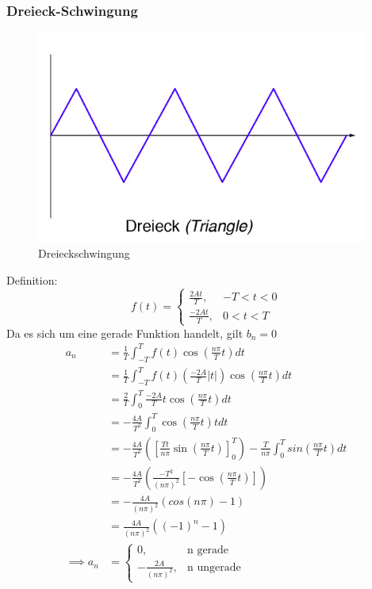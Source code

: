   \subsubsection{Dreieck-Schwingung}
  \begin{figure}[H]
    \centering
    \includegraphics[height=7cm]{Dreieck.png}
    \caption{Dreieckschwingung \cite{Schwingungen}}
    \label{fig:deck}
  \end{figure}
  Definition:
  \begin{equation}
    f(t)= \begin{cases}
          \frac{2At}{T}   , & -T < t < 0 \\
          \frac{-2At}{T} , & 0 < t < T
        \end{cases}
  \end{equation}
  Da es sich um eine gerade Funktion handelt, gilt $ b_n = 0$
  \begin{align*}
    a_n &= \frac{1}{T} \int_{-T}^T f(t) \cos \left( \frac{n\pi}{T} t\right) dt \\
    &= \frac{1}{T} \int_{-T}^T f(t) \left(\frac{-2A}{T} \lvert t\rvert\right)
    \cos \left(\frac{n\pi}{T} t\right) dt \\
    &= \frac{2}{T} \int_0^T \frac{-2A}{T} t \cos \left(\frac{n\pi}{T} t\right) dt \\
    &= -\frac{4A}{T^2} \int_0^T \cos \left(\frac{n\pi}{T} t\right) t dt \\
    &= -\frac{4A}{T^2} \left(\left[\frac{Tt}{n\pi} \sin \left(\frac{n\pi}{T}t\right)\right]_0^T\right)
    - \frac{T}{n\pi} \int_0^T sin\left(\frac{n\pi}{T}t\right)dt \\
    &= -\frac{4A}{T^2} \left(\frac{-T^2}{(n\pi)^2}\left[-\cos\left(\frac{n\pi}{T}t\right)\right]\right) \\
    &= -\frac{4A}{(n\pi)^2} (cos(n\pi)-1) \\
    &= \frac{4A}{(n\pi)^2} ((-1)^n-1) \\
    \implies a_n &= \begin{cases}
          0  , &\text{n gerade} \\
          -\frac{2A}{(n\pi)^2}  , &\text{n ungerade}
        \end{cases}
\end{align*}

